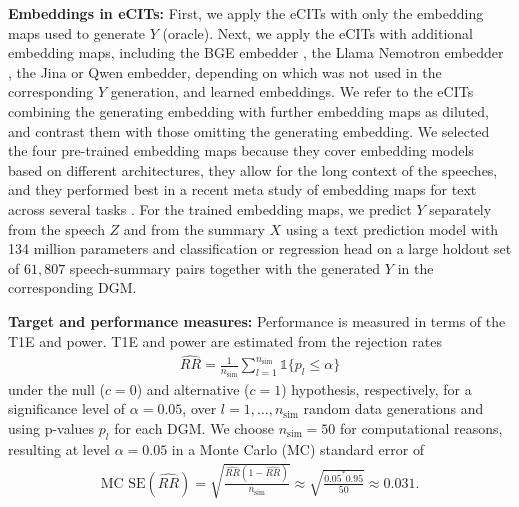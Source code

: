 \documentclass[twoside,11pt]{article}
\begin{document}
\textbf{Embeddings in eCITs:} First, we apply the eCITs with only the embedding maps used to generate $Y$ (oracle). 
Next, we apply the eCITs with additional embedding maps, including the BGE embedder \citep{chen2024m3}, the Llama Nemotron embedder \citep{moreira2024nv, nvidia_llama_nemotron_embed_1b_v2}, the Jina or Qwen embedder, depending on which was not used in the corresponding $Y$ generation, and learned embeddings. 
We refer to the eCITs combining the generating embedding with further embedding maps as diluted, and contrast them with those omitting the generating embedding.
We selected the four pre-trained embedding maps because they cover embedding models based on different architectures, they allow for the long context of the speeches, and they performed best in a recent meta study of embedding maps for text across several tasks \citep{gjorgjevikj2026robustness}. 
For the trained embedding maps, we predict $Y$ separately from the speech $Z$ and from the summary $X$ using a text prediction model with 134 million parameters  and classification or regression head \citep{wunderle2025new} on a large holdout set of $61{,}807$ speech-summary pairs together with the generated $Y$ in the corresponding DGM.

\textbf{Target and performance measures:}
Performance is measured in terms of the T1E and power. 
T1E and power are estimated from the rejection rates 
\begin{align*}
    \widehat{RR}=\frac{1}{n_{\text{sim}}}\sum_{l=1}^{n_{\text{sim}}}\mathds{1}\{p_l\leq \alpha\}
\end{align*}
under the null ($c=0$) and alternative ($c=1$) hypothesis, respectively, for a significance level of $\alpha=0.05$, over $l=1,\hdots,n_{\text{sim}}$ random data generations and using p-values $p_l$ for each DGM. We choose $n_{\text{sim}}=50$ for computational reasons, resulting at level $\alpha=0.05$ in a 
Monte Carlo (MC) standard error \citep[sec.~5.3]{morris2019using} of
\begin{align*}
    \text{MC SE}(\widehat{RR})=\sqrt{\frac{\widehat{RR}(1-\widehat{RR})}{n_{\text{sim}}}}\approx \sqrt{\frac{0.05^*0.95}{50}}\approx 0.031.
\end{align*}
\end{document}
